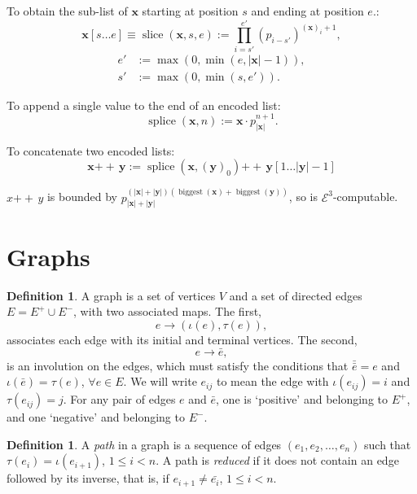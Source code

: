 \documentclass[a4paper]{article}
\newcommand{\grz}[1]{$\mathcal{E}^{#1}$}	%
\newcommand{\xvec}{\mathbf{x}}	%
\newcommand{\yvec}{\mathbf{y}}	%
\newcommand{\concat}{\ensuremath{+\!\!\!\!+\,}}	%
\theoremstyle{plain}
\theoremstyle{definition}
\newtheorem{definition}[theorem]{Definition}
\begin{document}
To obtain the sub-list of $\xvec$ starting at position $s$ and ending at position $e$.:
\begin{equation} \xvec[s \dots e] \equiv \operatorname{slice}(\xvec,s,e) := \prod_{i=s'}^{e'}(p_{i-s'})^{(\xvec)_i+1}, \end{equation}
\begin{equation*} 
\begin{split}
	e' &:= \max(0,\min(e,|\xvec|-1)), \\ 
	s' &:= \max(0,\min(s,e')). 
\end{split}
\end{equation*}

To append a single value to the end of an encoded list:
\begin{equation} \operatorname{splice}(\xvec,n) := \xvec \cdot p_{|\xvec|}^{n+1}. \end{equation}

To concatenate two encoded lists:
\begin{equation} \xvec \concat \yvec := \operatorname{splice}(\xvec,(\yvec)_0) \concat \yvec[1 \dots |\yvec|-1] \end{equation}

$x \concat y$ is bounded by $p_{|\xvec|+|\yvec|}^{(|\xvec|+|\yvec|) (\operatorname{biggest}(\xvec)+\operatorname{biggest}(\yvec))}$, so is \grz{3}-computable.

\section{Graphs \label{graphs}}

\begin{definition}
A graph is a set of vertices $V$ and a set of directed edges $E = E^+ \cup E^-$, with two associated maps. The first,
\[ e \rightarrow (\iota(e), \tau(e)), \]
associates each edge with its initial and terminal vertices. The second,
\[ e \rightarrow \bar{e}, \]
is an involution on the edges, which must satisfy the conditions that $\bar{\bar{e}} = e$ and $\iota(\bar{e}) = \tau(e)$, $\forall e \in E$. We will write $e_{ij}$ to mean the edge with $\iota(e_{ij}) = i$ and $\tau(e_{ij})=j$. For any pair of edges $e$ and $\bar{e}$, one is `positive' and belonging to $E^+$, and one `negative' and belonging to $E^-$.
\end{definition}

\begin{definition}
A {\it path} in a graph is a sequence of edges $(e_1, e_2, \dots, e_n)$ such that $\tau(e_i) = \iota(e_{i+1})$, $1 \leq i < n$. A path is {\it reduced} if it does not contain an edge followed by its inverse, that is, if $e_{i+1} \neq \bar{e_i}$, $1 \leq i < n$. 
\end{definition}
\end{document}
